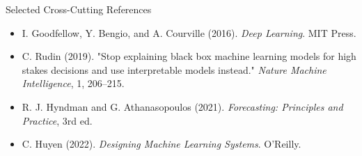 \documentclass[aspectratio=169]{beamer}
\begin{document}
\begin{frame}{Selected Cross-Cutting References}
  \small
  \begin{itemize}
    \item I. Goodfellow, Y. Bengio, and A. Courville (2016). \textit{Deep Learning}. MIT Press.
    \item C. Rudin (2019). "Stop explaining black box machine learning models for high stakes decisions and use interpretable models instead." \textit{Nature Machine Intelligence}, 1, 206--215.
    \item R. J. Hyndman and G. Athanasopoulos (2021). \textit{Forecasting: Principles and Practice}, 3rd ed.
    \item C. Huyen (2022). \textit{Designing Machine Learning Systems}. O'Reilly.
  \end{itemize}
\end{frame}

\contactslide
\end{document}
